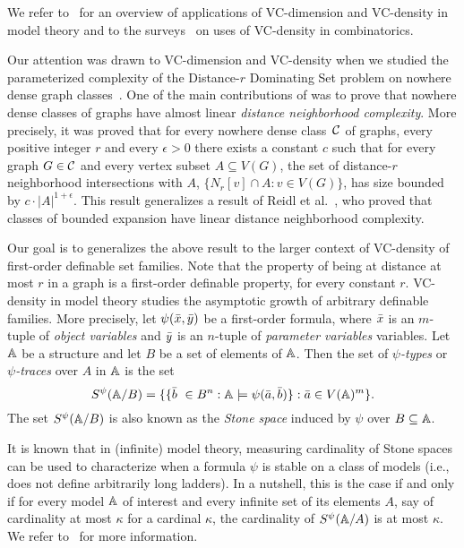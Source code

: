 We refer to~\cite{aschenbrenner2016vapnik} for an overview of 
applications of VC-dimension and VC-density in model
theory and to the surveys~\cite{furedi1991traces,matouvsek1998geometric} 
on uses of VC-density in
combinatorics. 

Our attention was drawn to VC-dimension and 
VC-density when we studied the parameterized 
complexity of the {\sc Distance-$r$ Dominating Set} 
problem on nowhere dense graph classes~\cite{eickmeyer2016neighborhood}. 
One of the main contributions of \cite{eickmeyer2016neighborhood}
was to prove that nowhere dense classes of graphs have almost linear
\emph{distance neighborhood complexity}. More precisely, it
was proved that for every nowhere dense class~$\mathcal{C}$ of 
graphs, every positive integer $r$ and every $\epsilon>0$ there
exists a constant $c$ such that for every graph $G\in\mathcal{C}$ and
every vertex subset $A\subseteq V(G)$, the set of distance-$r$ neighborhood intersections with $A$,
$\{N_r[v]\cap A \colon v\in V(G)\}$,
has size bounded by $c\cdot |A|^{1+\epsilon}$. This result
generalizes a result of Reidl et al.~\cite{reidl2016characterising}, who proved that classes of bounded expansion have linear distance neighborhood complexity. 

Our goal is to generalizes the above result to the larger context of VC-density of first-order definable set families.
Note that the property of being at distance at most $r$ in a graph is 
a first-order definable property, for every constant $r$.
VC-density in model theory studies the asymptotic growth 
of arbitrary definable families. More precisely, 
let $\psi(\bar{x},\bar{y})$ be a first-order formula, where 
$\bar{x}$ is an $m$-tuple of \emph{object variables} and $\bar{y}$ is an $n$-tuple of \emph{parameter variables} variables. 
Let $\mathbb{A}$ be a structure and let $B$ be a set of elements of
$\mathbb{A}$. Then the set of \emph{$\psi$-types} or 
\emph{$\psi$-traces} over $A$ in 
$\mathbb{A}$ is the set
\[S^\psi(\mathbb{A}/B)=\{\{\bar{b}\ \in B^n : \mathbb{A}\models\psi(\bar{a},\bar{b})\} : \bar{a}\in V(\mathbb{A})^m\}.\]
The set $S^\psi(\mathbb{A}/B)$ is also known as the {\em{Stone space}} induced by $\psi$ over $B\subseteq \mathbb{A}$.

It is known that in (infinite) model theory,
measuring cardinality of Stone spaces can be used to characterize when a formula $\psi$ is stable on a class of models (i.e., does not define arbitrarily long ladders).
In a nutshell, this is the case if and only if for every model $\mathbb{A}$ of interest and every infinite set of its elements $A$, say of cardinality at most $\kappa$ for a cardinal $\kappa$,
the cardinality of $S^\psi(\mathbb{A}/A)$ is at most $\kappa$. We refer to~\cite{pillay} for more information.

